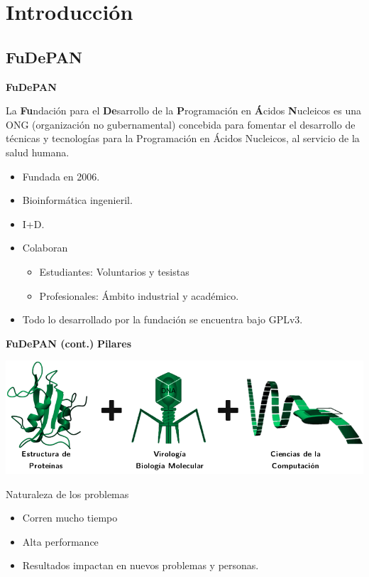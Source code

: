 \section{Introducción}

\subsection{FuDePAN}
	\begin{frame}{\textbf{FuDePAN}}
  	  \par La \textbf{Fu}ndación para el \textbf{De}sarrollo de la \textbf{P}rogramación en \textbf{Á}cidos \textbf{N}ucleicos es una ONG (organización no gubernamental) concebida	para fomentar el desarrollo de técnicas y tecnologías para la Programación en Ácidos Nucleicos, al servicio de la salud humana.\\[0.2cm]

	  \pause
  	  \begin{itemize}
      	\item Fundada en 2006.
      	\item Bioinformática ingenieril.
      	\item I+D.
      	\item Colaboran
      	  \begin{itemize}
      	      \item Estudiantes: Voluntarios y tesistas
      	      \item Profesionales: Ámbito industrial y académico.
      	  \end{itemize}
      	\item Todo lo desarrollado por la fundación se encuentra bajo GPLv3.
      \end{itemize}	
	\end{frame}

    \begin{frame}{\textbf{FuDePAN (cont.)}}
       \large{\textbf{Pilares}}
       \begin{center}
           \includegraphics[scale=0.30]{images/fudesuma.png}
       \end{center}
       \pause
       \begin{block}{Naturaleza de los problemas}
           \begin{itemize}
               \item Corren mucho tiempo
               \item Alta performance
               \item Resultados impactan en nuevos problemas y personas.
           \end{itemize}
      \end{block}
	\end{frame}

